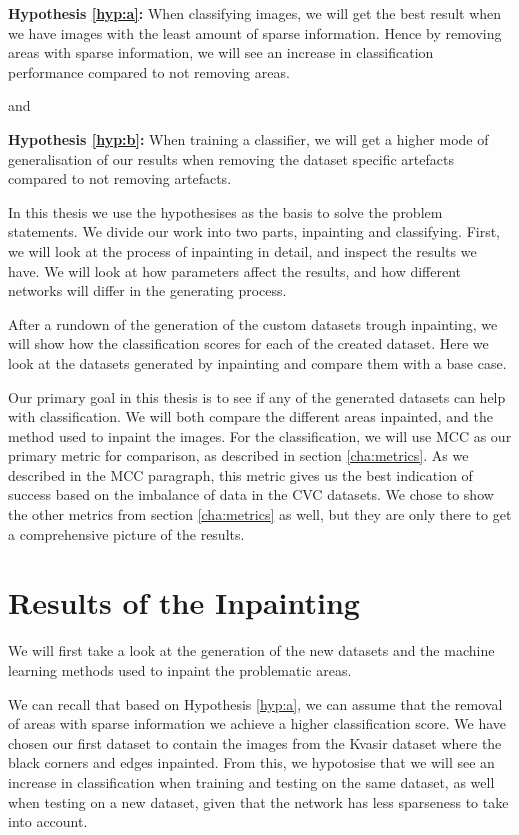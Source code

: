 \noindent
\textbf{Hypothesis \ref{hyp:a}:}
When classifying images, we will get the best result when we have images with the least amount of sparse information. 
Hence by removing areas with sparse information,
we will see an increase in classification performance compared to not removing areas.

\vspace{5px}
\noindent
and
\vspace{5px}

\noindent 
\textbf{Hypothesis \ref{hyp:b}:}
When training a classifier, we will get a higher
mode of generalisation of our results when removing the dataset
specific artefacts compared to not removing artefacts.
\vspace{5px}

In this thesis we use the hypothesises as the basis to solve the problem statements. 
We divide our work into two parts, inpainting and classifying. 
First, we will look at the process of inpainting in detail, and inspect the results we have.  
We will look at how parameters affect the results, and how different networks will differ in the generating process. 


After a rundown of the generation of the custom datasets trough inpainting, we will show how the classification scores for each of the created dataset. Here we look at the datasets generated by inpainting and compare them with a base case. 

Our primary goal in this thesis is to see if any of the generated datasets can help with classification. We will both compare the different areas inpainted, and the method used to inpaint the images. 
For the classification, we will use MCC as our primary metric for comparison, as described in section \ref{cha:metrics}. As we described in the MCC paragraph, this metric gives us the best indication of success based on the imbalance of data in the CVC datasets. We chose to show the other metrics from section \ref{cha:metrics} as well, but they are only there to get a comprehensive picture of the results.




\section{Results of the Inpainting}
We will first take a look at the generation of the new datasets and the machine learning methods used to inpaint the problematic areas.

We can recall that based on  Hypothesis \ref{hyp:a}, we can assume that the removal of areas with sparse information we achieve a higher classification score. We have chosen our first dataset to contain the images from the Kvasir dataset where the black corners and edges inpainted. 
From this, we hypotosise that we will see an increase in classification when training and testing on the same dataset, as well when testing on a new dataset, given that the network has less sparseness to take into account. 

